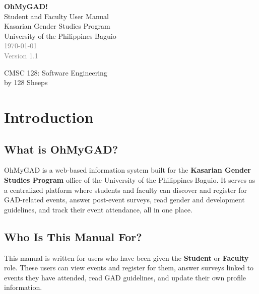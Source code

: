 \documentclass[12pt, a4paper]{article}
\begin{document}
\begin{titlepage}
  \centering
  \vspace*{3cm}

  {\Huge\bfseries\textcolor{primarydark}{OhMyGAD!}}\\[0.4cm]
  {\LARGE\textcolor{primarydark}{Student and Faculty User Manual}}\\[1.5cm]

  {\large Kasarian Gender Studies Program}\\[0.5cm]
  {\large University of the Philippines Baguio}\\[2cm]

  \textcolor{gray}{\today}\\[0.5cm]
  \textcolor{gray}{Version 1.1}

  \vfill
  {\small CMSC 128: Software Engineering}\\
  {\small by 128 Sheeps}
\end{titlepage}

\tableofcontents
\newpage

\section{Introduction}

\subsection{What is OhMyGAD?}
OhMyGAD is a web-based information system built for the \textbf{Kasarian Gender Studies Program} office of the University of the Philippines Baguio. It serves as a centralized platform where students and faculty can discover and register for GAD-related events, answer post-event surveys, read gender and development guidelines, and track their event attendance, all in one place.

\subsection{Who Is This Manual For?}
This manual is written for users who have been given the \textbf{Student} or \textbf{Faculty} role. These users can view events and register for them, answer surveys linked to events they have attended, read GAD guidelines, and update their own profile information.
\end{document}
